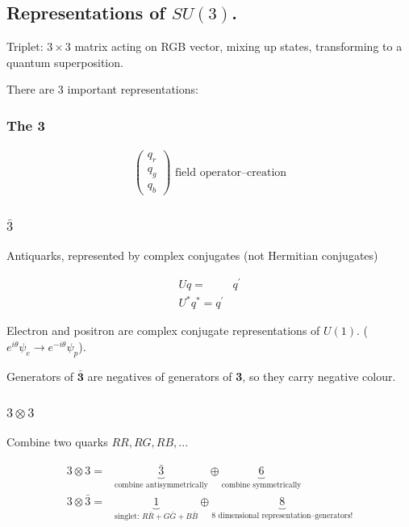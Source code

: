 \documentclass[]{article}
\begin{document}
\subsection{Representations of $SU(3)$.}

Triplet: $3\times3$ matrix acting on RGB vector, mixing up states, transforming to a quantum superposition.

There are 3 important representations: 

\subsubsection{The \bfseries{3}}

\begin{align*}
	\begin{pmatrix}
		q_r\\
		q_g\\
		q_b
	\end{pmatrix} \text{ field operator--creation}
\end{align*} 

\subsubsection{$\bar{3}$}

Antiquarks, represented by complex conjugates (not Hermitian conjugates)

\begin{align*}
	U q =& q^\prime\\
	U^* q^* = q^\prime& 
\end{align*}

Electron and positron are complex conjugate representations of $U(1)$. ($e^{i\theta}\psi_e \rightarrow e^{-i\theta}\psi_p$).

Generators of $\bm{\bar{3}}$ are negatives of generators of {\bfseries 3}, so they carry negative colour.

\subsubsection{$3 \otimes 3$}\label{sec:3:3:8}

Combine two quarks ${RR, RG, RB,...}$

\begin{align*}
	3 \otimes 3 =& \underbrace{\bar{3}}_\text{combine antisymmetrically} \oplus \underbrace{6}_\text{combine symmetrically}\\
	3 \otimes \bar{3} =& \underbrace{1}_\text{singlet: $R\bar{R}+G\bar{G}+B\bar{B}$} \oplus \underbrace{8}_\text{8 dimensional representation--generators!}
\end{align*}
\end{document}
